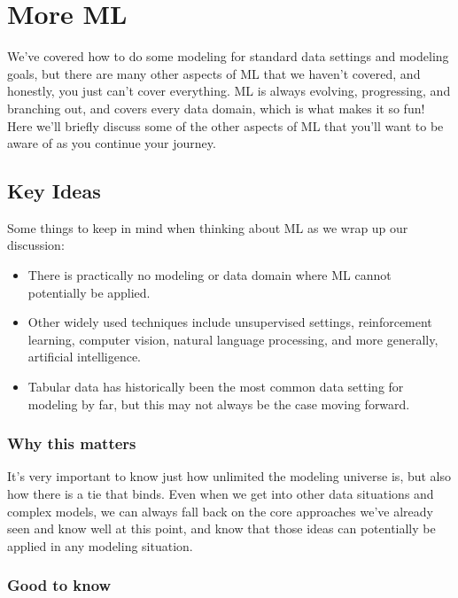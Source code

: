 \documentclass[
  letterpaper,
]{krantz}
\providecommand{\tightlist}{%
  \setlength{\itemsep}{0pt}\setlength{\parskip}{0pt}}\usepackage{longtable,booktabs,array}
\begin{document}
\chapter{More ML}\label{more-ml}

We've covered how to do some modeling for standard data settings and
modeling goals, but there are many other aspects of ML that we haven't
covered, and honestly, you just can't cover everything. ML is always
evolving, progressing, and branching out, and covers every data domain,
which is what makes it so fun! Here we'll briefly discuss some of the
other aspects of ML that you'll want to be aware of as you continue your
journey.

\section{Key Ideas}\label{key-ideas-5}

Some things to keep in mind when thinking about ML as we wrap up our
discussion:

\begin{itemize}
\tightlist
\item
  There is practically no modeling or data domain where ML cannot
  potentially be applied.
\item
  Other widely used techniques include unsupervised settings,
  reinforcement learning, computer vision, natural language processing,
  and more generally, artificial intelligence.
\item
  Tabular data has historically been the most common data setting for
  modeling by far, but this may not always be the case moving forward.
\end{itemize}

\subsection{Why this matters}\label{why-this-matters-2}

It's very important to know just how unlimited the modeling universe is,
but also how there is a tie that binds. Even when we get into other data
situations and complex models, we can always fall back on the core
approaches we've already seen and know well at this point, and know that
those ideas can potentially be applied in any modeling situation.

\subsection{Good to know}\label{good-to-know-2}
\end{document}
